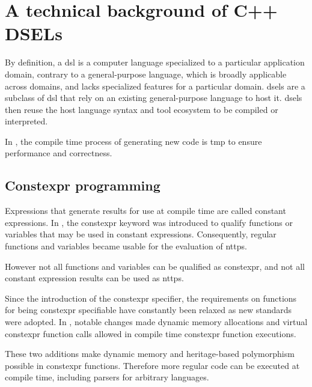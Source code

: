 \documentclass[../main]{subfiles}
\begin{document}

\section{
  A technical background of C++ DSELs
}


By definition, a \gls{dsl} is a computer language
specialized to a particular application domain, contrary to a general-purpose
language, which is broadly applicable across domains, and lacks specialized
features for a particular domain. \glspl{dsel}
are a subclass of \gls{dsl} that rely on an existing general-purpose language to host
it. \glspl{dsel} then reuse the host language syntax and tool ecosystem to be compiled
or interpreted.

In \cpp, the compile time process of generating new code is
\gls{tmp} to ensure performance and correctness.


\subsection{
  Constexpr programming
}
\label{lbl:constexpr-programming}

Expressions that generate results for use at compile time are called
constant expressions. In , the \gls{constexpr} keyword was introduced
to qualify functions or variables that may be used in constant expressions.
Consequently, regular functions and variables became usable for the evaluation
of \glspl{nttp}.

However not all functions and variables can be qualified as \gls{constexpr},
and not all constant expression results can be used as \glspl{nttp}.

Since the introduction of the \gls{constexpr} specifier, the requirements on
functions for being \gls{constexpr} specifiable have constantly been relaxed as new
\cpp standards were adopted. In , notable changes made dynamic memory
allocations\cite{constexpr-memory} and virtual \gls{constexpr} function
calls\cite{virtual-constexpr} allowed in compile time \gls{constexpr} function
executions.

These two additions make dynamic memory and heritage-based polymorphism
possible in \gls{constexpr} functions. Therefore more regular \cpp code can be
executed at compile time, including parsers for arbitrary languages.
\end{document}
